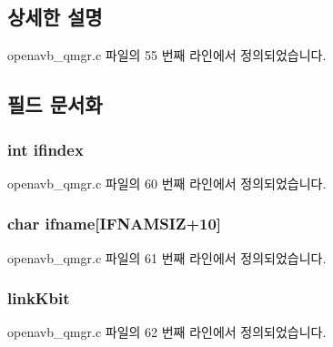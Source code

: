 \subsection{상세한 설명}


openavb\+\_\+qmgr.\+c 파일의 55 번째 라인에서 정의되었습니다.



\subsection{필드 문서화}
\subsubsection[{\texorpdfstring{ifindex}{ifindex}}]{\setlength{\rightskip}{0pt plus 5cm}int ifindex}\hypertarget{structqdisc__data__t_a01e636f8746c84f1cf3d45c4afbfde35}{}\label{structqdisc__data__t_a01e636f8746c84f1cf3d45c4afbfde35}


openavb\+\_\+qmgr.\+c 파일의 60 번째 라인에서 정의되었습니다.

\subsubsection[{\texorpdfstring{ifname}{ifname}}]{\setlength{\rightskip}{0pt plus 5cm}char ifname\mbox{[}{\bf I\+F\+N\+A\+M\+S\+IZ}+10\mbox{]}}\hypertarget{structqdisc__data__t_a11d6071e5fa37b0c5776e17651485f11}{}\label{structqdisc__data__t_a11d6071e5fa37b0c5776e17651485f11}


openavb\+\_\+qmgr.\+c 파일의 61 번째 라인에서 정의되었습니다.

\subsubsection[{\texorpdfstring{link\+Kbit}{linkKbit}}]{ link\+Kbit}\hypertarget{structqdisc__data__t_a5d1fd52b21b7b3355046dbbc59bdf6a5}{}\label{structqdisc__data__t_a5d1fd52b21b7b3355046dbbc59bdf6a5}


openavb\+\_\+qmgr.\+c 파일의 62 번째 라인에서 정의되었습니다.

